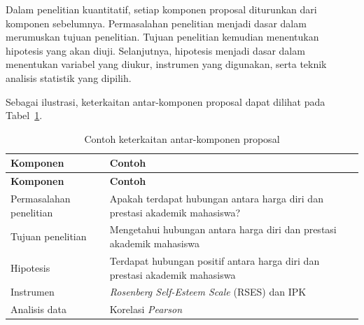 \documentclass[
  indonesian,
  letterpaper,
  DIV=11,
  numbers=noendperiod]{scrreprt}
\begin{document}
Dalam penelitian kuantitatif, setiap komponen proposal diturunkan dari
komponen sebelumnya. Permasalahan penelitian menjadi dasar dalam
merumuskan tujuan penelitian. Tujuan penelitian kemudian menentukan
hipotesis yang akan diuji. Selanjutnya, hipotesis menjadi dasar dalam
menentukan variabel yang diukur, instrumen yang digunakan, serta teknik
analisis statistik yang dipilih.

Sebagai ilustrasi, keterkaitan antar-komponen proposal dapat dilihat
pada Tabel~\ref{tbl-komponen}.

\begin{longtable}[]{@{}
  >{\raggedright\arraybackslash}p{}
  >{\raggedright\arraybackslash}p{}@{}}
\caption{Contoh keterkaitan antar-komponen
proposal}\label{tbl-komponen}\tabularnewline
\toprule\noalign{}
\begin{minipage}[b]{\linewidth}\raggedright
\textbf{Komponen}
\end{minipage} & \begin{minipage}[b]{\linewidth}\raggedright
\textbf{Contoh}
\end{minipage} \\
\midrule\noalign{}
\endfirsthead
\toprule\noalign{}
\begin{minipage}[b]{\linewidth}\raggedright
\textbf{Komponen}
\end{minipage} & \begin{minipage}[b]{\linewidth}\raggedright
\textbf{Contoh}
\end{minipage} \\
\midrule\noalign{}
\endhead
\bottomrule\noalign{}
\endlastfoot
Permasalahan penelitian & Apakah terdapat hubungan antara harga diri dan
prestasi akademik mahasiswa? \\
Tujuan penelitian & Mengetahui hubungan antara harga diri dan prestasi
akademik mahasiswa \\
Hipotesis & Terdapat hubungan positif antara harga diri dan prestasi
akademik mahasiswa \\
Instrumen & \emph{Rosenberg Self-Esteem Scale} (RSES) dan IPK \\
Analisis data & Korelasi \emph{Pearson} \\
\end{longtable}
\end{document}
